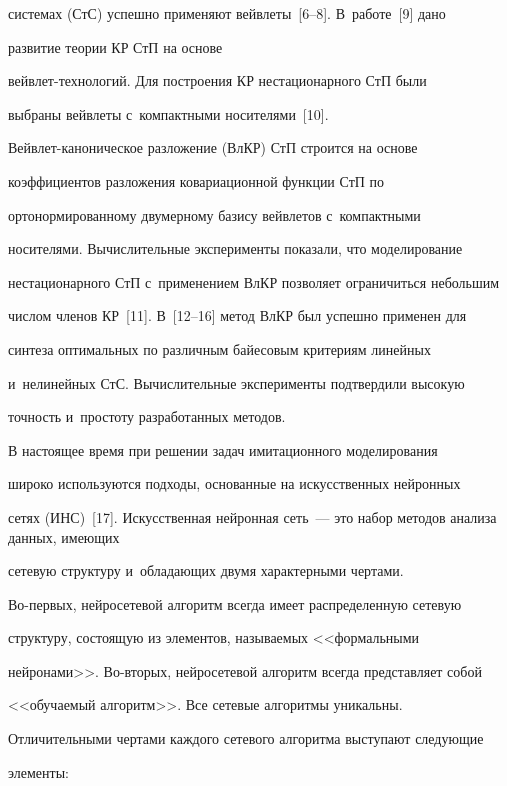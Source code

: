системах (СтС) успешно применяют вейвлеты~[6--8]. В~работе~[9] дано 


развитие теории КР СтП на основе  


вейв\-лет-тех\-но\-ло\-гий. Для построения КР нестационарного СтП были 


выбраны вейвлеты с~компактными носителями~[10].  


Вейв\-лет-ка\-но\-ни\-че\-ское разложение (ВлКР) СтП строится на основе 


коэффициентов разложения ковариационной функции СтП по 


ортонормированному двумерному базису вейвлетов с~компактными 


носителями. Вычислительные эксперименты показали, что моделирование 


нестационарного СтП с~применением ВлКР позволяет ограничиться небольшим 


числом членов КР~[11]. В~[12--16] метод ВлКР был успешно применен для 


синтеза оптимальных по различным байесовым критериям линейных 


и~нелинейных СтС. Вычислительные эксперименты подтвердили высокую 


точность и~простоту разработанных методов.


  


  В настоящее время при решении задач имитационного моделирования 


широко используются подходы, основанные на искусственных нейронных 


сетях (ИНС)~[17]. Искусственная нейронная сеть~--- это набор методов анализа данных, име\-ющих 


сетевую структуру и~об\-ла\-да\-ющих двумя характерными чертами.  


Во-пер\-вых, нейросетевой алгоритм всегда имеет распределенную сетевую 


структуру, состоящую из элементов, называемых <<формальными 


нейронами>>. Во-вто\-рых, нейросетевой алгоритм всегда представляет собой 


<<обуча\-емый алгоритм>>. Все сетевые алгоритмы уникальны. 


Отличительными чертами каждого сетевого алгоритма выступают следующие 


элементы:


